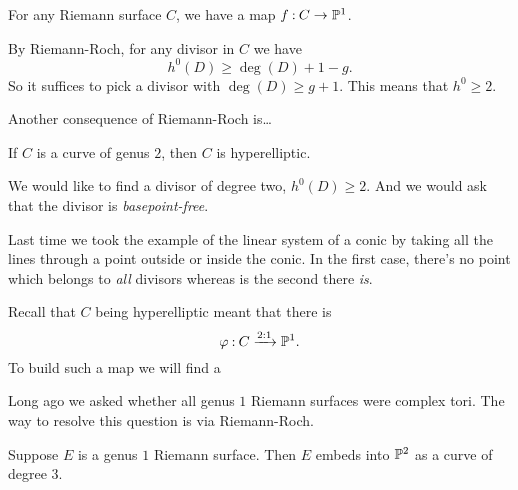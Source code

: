 \documentclass[12pt]{memoir}
\begin{document}
\begin{Prop}
    For any Riemann surface $C$, we have a map $f\mathbin{:} C\to\mathbb{P}^1$.
\end{Prop}

\begin{ptcbp}
    By Riemann-Roch, for any divisor in $C$ we have
    $$h^0(D)\geq \deg(D)+1-g.$$
    So it suffices to pick a divisor with $\deg(D)\geq g+1$. This means that $h^0\geq 2$.
\end{ptcbp}

Another consequence of Riemann-Roch is\dots
\begin{Prop}
    If $C$ is a curve of genus $2$, then $C$ is hyperelliptic.
\end{Prop}

We would like to find a divisor of degree two, $h^0(D)\geq 2$. And we would ask that the divisor is \emph{basepoint-free}.

\begin{Ex}
    Last time we took the example of the linear system of a conic by taking all the lines through a point outside or inside the conic. In the first case, there's no point which belongs to \emph{all} divisors whereas is the second there \emph{is}.
\end{Ex}

\begin{ptcbp}
    Recall that $C$ being hyperelliptic meant that there is 
    $$\varphi\mathbin{:} C\xrightarrow{2:1}\mathbb{P}^1.$$
    To build such a map we will find a 
\end{ptcbp}

Long ago we asked whether all genus $1$ Riemann surfaces were complex tori. The way to resolve this question is via Riemann-Roch.

\begin{Prop}
    Suppose $E$ is a genus $1$ Riemann surface. Then $E$ embeds into $\mathbb{P}^2$ as a curve of degree $3$.
\end{Prop}
\end{document}
